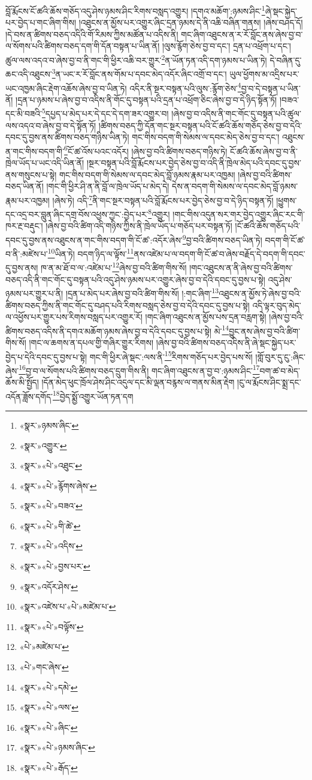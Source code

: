 བློ་རྨོངས་ངོ་ཚའི་ཆོས་གཅོད་འདུ་ཤེས་ཉམས་ཤིང་རིགས་བསླད་འགྱུར། །དགའ་མཆོག་:ཉམས་ཤིང་\footnote{«སྣར་»ཉམས་ཞིང་}ཞེ་སྡང་སྐྱེད་པར་བྱེད་པ་གང་ཞིག་གིས། །འཐུངས་ན་མྱོས་པར་འགྱུར་ཞིང་དྲན་ཉམས་དེ་ནི་འཆི་བཞིན་གནས། །ཞེས་བཤད་དོ། །དེ་བས་ན་ཚིགས་བཅད་འདིའི་གོ་རིམས་ཀྱིས་མཚོན་པ་འདིས་ནི། གང་ཞིག་འཐུངས་ན་ར་རོ་བློང་ནས་ཞེས་བྱ་བ་ལ་སོགས་པའི་ཚིགས་བཅད་དག་གི་དོན་བསྟན་པ་ཡིན་ནོ། །ལུས་རྙོག་ཅེས་བྱ་བ་དང་། དྲན་པ་འཕྲོག་པ་དང་། ཚུལ་ལས་འདའ་བ་ཞེས་བྱ་བ་ནི་གང་གི་ཕྱིར་འཆི་བར་གྱུར་\footnote{«སྣར་»འགྱུར་}ན་ཡོན་ཏན་འདི་དག་ཉམས་པ་ཡིན་ཏེ། དེ་བཞིན་དུ་ཆང་འདི་འཐུངས་\footnote{«སྣར་»«པེ་»འཐུང་}ན་ཡང་ར་རོ་བློང་ནས་གོམ་པ་དབང་མེད་འདོར་ཞིང་འགྲོ་བ་དང་། ཡུལ་ཕྱོགས་མ་འདྲིས་པར་ཡང་འཁྱམ་ཞིང་རྡེག་འཆོས་ཞེས་བྱ་བ་ཡིན་ཏེ། འདིར་ནི་སྔར་བསྟན་པའི་ལུས་:རྙོག་ཅེས་\footnote{«སྣར་»«པེ་»རྙོགས་ཞེས་}བྱ་བ་དེ་བསྟན་པ་ཡིན་ནོ། །དྲན་པ་ཉམས་པ་ཞེས་བྱ་བ་འདིས་ནི་གོང་དུ་བསྟན་པའི་དྲན་པ་འཕྲོག་ཅིང་ཞེས་བྱ་བ་དེ་ཉིད་སྟོན་ཏོ། །བཟའ་དང་མི་བཟའི་\footnote{«སྣར་»«པེ་»བཟའ་}དཔྱད་པ་མེད་པར་དེ་དང་དེ་དག་ཟར་འགྱུར་བ། །ཞེས་བྱ་བ་འདིས་ནི་གང་གོང་དུ་བསྟན་པའི་ཚུལ་ལས་འདའ་བ་ཞེས་བྱ་བ་དེ་སྟོན་ཏོ། །ཚིགས་བཅད་ཀྱི་དོན་གང་སྔར་བསྟན་པའི་ངོ་ཚའི་ཆོས་གཅོད་ཅེས་བྱ་བ་དེའི་དབང་དུ་བྱས་ནས་ཚིགས་བཅད་གཉིས་ཡིན་ཏེ། གང་གིས་བདག་གི་སེམས་ལ་དབང་མེད་ཅེས་བྱ་བ་དང་། འཐུངས་ན་གང་གིས་བདག་གི་\footnote{«སྣར་»«པེ་»གི་ཚེ་}ངོ་ཚ་འོས་པའང་འདོར། །ཞེས་བྱ་བའི་ཚིགས་བཅད་གཉིས་ཏེ། ངོ་ཚའི་ཆོས་ཞེས་བྱ་བ་ནི་ཁྲེལ་ཡོད་པ་ཡང་འདི་ཡིན་ནོ། །སྔར་བསྟན་པའི་བློ་རྨོངས་པར་བྱེད་ཅེས་བྱ་བ་འདི་ནི་ཁྲེལ་མེད་པའི་དབང་དུ་བྱས་ནས་གསུངས་པ་སྟེ། གང་གིས་བདག་གི་སེམས་ལ་དབང་མེད་བློ་ཉམས་རྣམ་པར་འཁྱམ། །ཞེས་བྱ་བའི་ཚིགས་བཅད་ཡིན་ནོ། །གང་གི་ཕྱིར་ཤི་ན་ནི་བློ་ལ་ཁྲེལ་ཡོད་པ་མེད་དེ། དེས་ན་བདག་གི་སེམས་ལ་དབང་མེད་བློ་ཉམས་རྣམ་པར་འཁྱམ། །ཞེས་ཏེ། འདི་\footnote{«སྣར་»«པེ་»འདིས་}ནི་གང་སྔར་བསྟན་པའི་བློ་རྨོངས་པར་བྱེད་ཅེས་བྱ་བ་དེ་ཉིད་བསྟན་ཏོ། །ཕྱུགས་དང་འདྲ་བར་བླུན་ཞིང་དགྲ་བོས་འཕྱས་ཀྱང་:བྱེད་པར་\footnote{«སྣར་»«པེ་»བྱས་པར་}འགྱུར། །གང་གིས་འདུན་སར་གར་བྱེད་འགྱུར་ཞིང་རང་གི་ཁར་རྔ་བརྡུང་། །ཞེས་བྱ་བའི་ཚིག་འདི་གཉིས་ཀྱིས་ནི་ཁྲེལ་ཡོད་པ་གཅོད་པར་བསྟན་ཏོ། །ངོ་ཚའི་ཆོས་གཅོད་པའི་དབང་དུ་བྱས་ནས་འཐུངས་ན་གང་གིས་བདག་གི་ངོ་ཚ་:འདོར་ཞེས་\footnote{«སྣར་»འདོར་ཤེས་}བྱ་བའི་ཚིགས་བཅད་ཡིན་ཏེ། བདག་གི་ངོ་ཚ་བ་ནི་:མཛེས་པ་\footnote{«སྣར་»འཛེས་པ་«པེ་»མཛེམ་པ་}ཡིན་ཏེ། བདག་ཉིད་ལ་ལྟོས་\footnote{«སྣར་»«པེ་»བལྟོས་}ནས་འཛེམ་པ་ལ་བདག་གི་ངོ་ཚ་བ་ཞེས་བརྗོད་དེ་བདག་གི་དབང་དུ་བྱས་ནས། ཁ་ན་མ་ཐོ་བ་ལ་:འཛེམ་པ་\footnote{«པེ་»མཛེམ་པ་}ཞེས་བྱ་བའི་ཚིག་གིས་སོ། །གང་འཐུངས་ན་ནི་ཞེས་བྱ་བའི་ཚིགས་བཅད་འདི་ནི་གང་གོང་དུ་བསྟན་པའི་འདུ་ཤེས་ཉམས་པར་འགྱུར་ཞེས་བྱ་བ་དེའི་དབང་དུ་བྱས་པ་སྟེ། འདུ་ཤེས་ཉམས་པར་གྱུར་པ་ནི། །དྲན་པ་མེད་པར་ཞེས་བྱ་བའི་ཚིག་གིས་སོ། །:གང་ཞིག་\footnote{«པེ་»གང་ཞེས་}འཐུངས་ན་མྱོས་ཏེ་ཞེས་བྱ་བའི་ཚིགས་བཅད་ཀྱིས་ནི་གང་གོང་དུ་བཤད་པའི་རིགས་བསླད་ཅེས་བྱ་བ་དེའི་དབང་དུ་བྱས་པ་སྟེ། འདི་ལྟར་བུད་མེད་ལ་འཕྱོས་པར་གྱུར་པས་རིགས་བསླད་པར་འགྱུར་རོ། །གང་ཞིག་འཐུངས་ན་མྱོས་པས་དྲན་བརླག་སྟེ། །ཞེས་བྱ་བའི་ཚིགས་བཅད་འདིས་ནི་དགའ་མཆོག་ཉམས་ཞེས་བྱ་བ་དེའི་དབང་དུ་བྱས་པ་སྟེ། མེ་\footnote{«སྣར་»«པེ་»དམེ་}བྱུང་ནས་ཞེས་བྱ་བའི་ཚིག་གིས་སོ། །གང་ལ་ཆགས་ན་དཔལ་གྱི་གཞིར་གྱུར་རིགས། །ཞེས་བྱ་བའི་ཚིགས་བཅད་འདིས་ནི་ཞེ་སྡང་སྐྱེད་པར་བྱེད་པ་དེའི་དབང་དུ་བྱས་པ་སྟེ། གང་གི་ཕྱིར་ཞེ་སྡང་:ལས་ནི་\footnote{«སྣར་»«པེ་»ལས་}རིགས་གཅོད་པར་བྱེད་པས་སོ། །གློ་བུར་དུ་ངུ་:ཞིང་ཞེས་\footnote{«སྣར་»«པེ་»ཞིང་}བྱ་བ་ལ་སོགས་པའི་ཚིགས་བཅད་དྲུག་གིས་ནི། གང་ཞིག་འཐུངས་ན་བྱ་བ་:ཉམས་ཤིང་\footnote{«སྣར་»«པེ་»ཉམས་ཞིང་}བག་ཚ་བ་མེད་ཆོས་མི་སྤྱོད། །དོན་མེད་ཕུང་ཁྲོལ་ཤེས་ཤིང་འདུལ་དང་མི་ལྡན་བརྙས་ལ་གནས་མིན་རྡེག །ངུ་ལ་རྨོངས་ཤིང་སྨྲ་དང་འདོན་ཟློས་དགོད་\footnote{«སྣར་»«པེ་»རྒོད་}བྱེད་སྨྱོ་འགྱུར་ཡོན་ཏན་དག 
